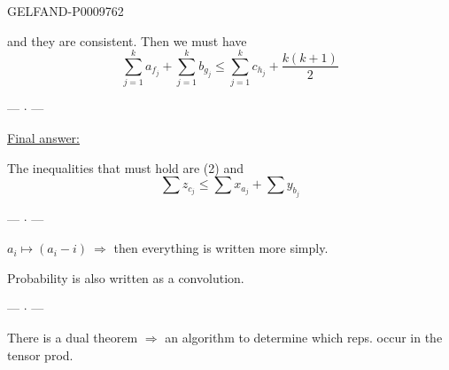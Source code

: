 \begin{GelfandAdjacentEvidence}{GELFAND-P000976}{2}


and they are consistent. Then we must have
\[
 \sum_{j=1}^{k}a_{f_j}+\sum_{j=1}^{k}b_{g_j}
 \leqslant \sum_{j=1}^{k}c_{h_j}+\frac{k(k+1)}2
\]

\begin{center}--- \(\cdot\) ---\end{center}

\underline{Final answer:}

The inequalities that must hold are (2) and
\begin{equation*}
 \sum z_{c_j}\leqslant\sum x_{a_j}+\sum y_{b_j}
 \tag{5}
\end{equation*}

\begin{center}--- \(\cdot\) ---\end{center}

$a_i\mapsto(a_i-i)\ \Rightarrow$ then everything is written more simply.

Probability is also written as a convolution.

\begin{center}--- \(\cdot\) ---\end{center}

There is a dual theorem $\Rightarrow$ an algorithm to determine which reps. occur in the tensor prod.
\end{GelfandAdjacentEvidence}


